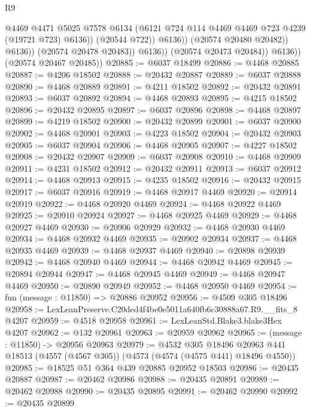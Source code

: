 \begin{lexlean}{R9}
\begin{coremodule}
                                @4469
                                @4471
                                @5025
                                @7578
                                @6134
                                (@6121 @724 @114 @4469 @4469 @723 @4239 (@19721 @723) @6136))
                              (@20544 @722))
                            @6136))
                        (@20574 @20480 @20482))
                      @6136))
                  (@20574 @20478 @20483))
                @6136))
            (@20574 @20473 @20484))
          @6136))
      (@20574 @20467 @20485))
@20885 := @6037 @18499
@20886 := @4468 @20885
@20887 := @4206 @18502
@20888 := @20432 @20887
@20889 := @6037 @20888
@20890 := @4468 @20889
@20891 := @4211 @18502
@20892 := @20432 @20891
@20893 := @6037 @20892
@20894 := @4468 @20893
@20895 := @4215 @18502
@20896 := @20432 @20895
@20897 := @6037 @20896
@20898 := @4468 @20897
@20899 := @4219 @18502
@20900 := @20432 @20899
@20901 := @6037 @20900
@20902 := @4468 @20901
@20903 := @4223 @18502
@20904 := @20432 @20903
@20905 := @6037 @20904
@20906 := @4468 @20905
@20907 := @4227 @18502
@20908 := @20432 @20907
@20909 := @6037 @20908
@20910 := @4468 @20909
@20911 := @4231 @18502
@20912 := @20432 @20911
@20913 := @6037 @20912
@20914 := @4468 @20913
@20915 := @4235 @18502
@20916 := @20432 @20915
@20917 := @6037 @20916
@20919 := @4468 @20917 @4469
@20920 := @20914 @20919
@20922 := @4468 @20920 @4469
@20924 := @4468 @20922 @4469
@20925 := @20910 @20924
@20927 := @4468 @20925 @4469
@20929 := @4468 @20927 @4469
@20930 := @20906 @20929
@20932 := @4468 @20930 @4469
@20934 := @4468 @20932 @4469
@20935 := @20902 @20934
@20937 := @4468 @20935 @4469
@20939 := @4468 @20937 @4469
@20940 := @20898 @20939
@20942 := @4468 @20940 @4469
@20944 := @4468 @20942 @4469
@20945 := @20894 @20944
@20947 := @4468 @20945 @4469
@20949 := @4468 @20947 @4469
@20950 := @20890 @20949
@20952 := @4468 @20950 @4469
@20954 := fun (message : @11850) => @20886 @20952
@20956 := @4509 @305 @18496
@20958 := LexLeanPreserve.C20ded4f4be0e5011a640fb6c30888a67.R9.__fits_8 @4207
@20959 := @4518 @20958
@20961 := LexLeanStd.Blake3.blake3Hex @4207
@20962 := @132 @20961
@20963 := @20959 @20962
@20965 := (message : @11850) -> @20956 @20963
@20979 := @4532
    @305
    @18496
    @20963
    @441
    @18513
    (@4557 (@4567 @305))
    (@4573 (@4574 (@4575 @441) @18496 @4550))
@20985 := @18525 @51 @364 @439 @20885 @20952 @18503
@20986 := @20435 @20887
@20987 := @20462 @20986
@20988 := @20435 @20891
@20989 := @20462 @20988
@20990 := @20435 @20895
@20991 := @20462 @20990
@20992 := @20435 @20899

\end{coremodule}
\end{lexlean}
